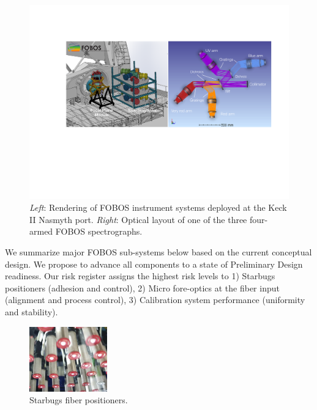 \documentclass[oneside,11pt]{amsart}
\begin{document}
\begin{figure}[h!]
\vskip -0.1in
\includegraphics[width=\textwidth]{figs/FOBOS_inst_2019-10-28.pdf}
\caption{\small {\it Left}: Rendering of FOBOS instrument systems
deployed at the Keck II Nasmyth port. {\it Right}: Optical layout of
one of the three four-armed FOBOS spectrographs.}
\label{fig:layout}
\end{figure}

We summarize major FOBOS sub-systems below based on the current
conceptual design. We propose to advance all components to a state of
Preliminary Design readiness. Our risk register assigns the highest
risk levels to 1) Starbugs positioners (adhesion and control), 2)
Micro fore-optics at the fiber input (alignment and process control),
3) Calibration system performance (uniformity and stability).

\begin{figure}\small
\includegraphics[width=0.3\textwidth]{figs/starbugs_v1.jpg}
\caption{Starbugs fiber positioners.}
\label{fig:org}
\end{figure}
\end{document}
